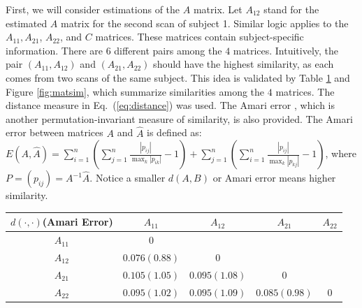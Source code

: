\documentclass[fleqn,12pt]{article}
\let\oldref\ref
\renewcommand{\ref}[1]{(\oldref{#1})}
\begin{document}
First, we will consider estimations of the $A$ matrix. Let $A_{12}$ stand for the estimated $A$ matrix for the second scan of subject 1. Similar logic applies to the $A_{11}, A_{21}$, $A_{22}$, and $C$ matrices. These matrices contain subject-specific information. There are $6$ different pairs among the $4$ matrices. Intuitively, the pair $(A_{11},A_{12})$ and $(A_{21},A_{22})$ should have the highest similarity, as each comes from two scans of the same subject. This idea is validated by Table \oldref{tab:similarity} and Figure \oldref{fig:matsim}, which summarize similarities among the  $4$ matrices. The distance measure in Eq.~\ref{eq:distance} was used. The Amari error \citep{amari1996new}, which is another permutation-invariant measure of similarity, is also provided. The Amari error between matrices $A$ and $\hat{A}$ is defined as: $E(A,\hat{A}) = \sum\limits_{i=1}^n(\sum\limits_{j=1}^n\frac{|p_{ij}|}{\max_k |p_{ik}|}-1) + \sum\limits_{j=1}^n(\sum\limits_{i=1}^n\frac{|p_{ij}|}{\max_k|p_{kj}|}-1)$, where $P =(p_{ij})=A^{-1}\hat{A}$. Notice a smaller $d(A,B)$ or Amari error means higher similarity.
%
%
%

\begin{table}
\centering
{}
\label{tab:similarity}
\begin{tabular}{c|cccc}
\hline
$d(\cdot,\cdot)$(Amari Error) & $A_{11}$&$A_{12}$ & $A_{21}$&$A_{22}$ \\
\hline
$A_{11}$ & $0$ &  &  &\\
$A_{12}$ & $\mathbf{0.076(0.88)}$& $0$ & &\\
$A_{21}$ & $0.105(1.05)$ & $0.095(1.08)$  & $0$ &\\
$A_{22}$ & $0.095(1.02)$ & $0.095(1.09)$ & $\mathbf{0.085(0.98)}$ & $0$ \\
\hline
\end{tabular}
\end{table}
\end{document}
